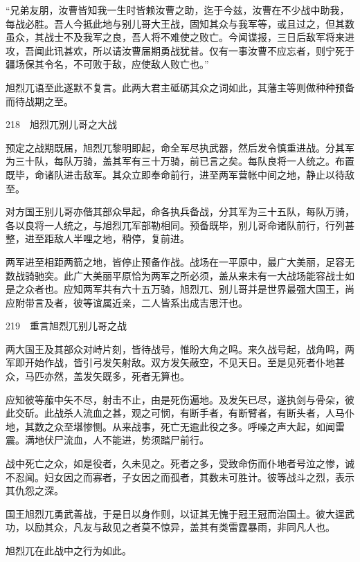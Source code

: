 \documentclass[12pt,UTF8]{ctexbook}
\begin{document}
“兄弟友朋，汝曹皆知我一生时皆赖汝曹之助，迄于今兹，汝曹在不少战中助我，每战必胜。吾人今抵此地与别儿哥大王战，固知其众与我军等，或且过之，但其数虽众，其战士不及我军之良，吾人将不难使之败亡。今闻谍报，三日后敌军将来进攻，吾闻此讯甚欢，所以请汝曹届期勇战犹昔。仅有一事汝曹不应忘者，则宁死于疆场保其令名，不可败于敌，应使敌人败亡也。”

旭烈兀语至此遂默不复言。此两大君主砥砺其众之词如此，其藩主等则做种种预备而待战期之至。





218　旭烈兀别儿哥之大战

预定之战期既届，旭烈兀黎明即起，命全军尽执武器，然后发令慎重进战。分其军为三十队，每队万骑，盖其军有三十万骑，前已言之矣。每队良将一人统之。布置既毕，命诸队进击敌军。其众立即奉命前行，进至两军营帐中间之地，静止以待敌至。

对方国王别儿哥亦偕其部众早起，命各执兵备战，分其军为三十五队，每队万骑，各以良将一人统之，与旭烈兀军部勒相同。预备既毕，别儿哥命诸队前行，行列甚整，进至距敌人半哩之地，稍停，复前进。

两军进至相距两箭之地，皆停止预备作战。战场在一平原中，最广大美丽，足容无数战骑驰突。此广大美丽平原恰为两军之所必须，盖从来未有一大战场能容战士如是之众者也。应知两军共有六十五万骑，旭烈兀、别儿哥并是世界最强大国王，尚应附带言及者，彼等谊属近亲，二人皆系出成吉思汗也。





219　重言旭烈兀别儿哥之战

两大国王及其部众对峙片刻，皆待战号，惟盼大角之鸣。来久战号起，战角鸣，两军即开始作战，皆引弓发矢射敌。双方发矢蔽空，不见天日。至是见死者仆地甚众，马匹亦然，盖发矢既多，死者无算也。

应知彼等菔中矢不尽，射击不止，由是死伤遍地。及发矢已尽，遂执剑与骨朵，彼此交斫。此战杀人流血之甚，观之可悯，有断手者，有断臂者，有断头者，人马仆地，其数之众至堪惨恻。从来战事，死亡无逾此役之多。呼噪之声大起，如闻雷震。满地伏尸流血，人不能进，势须踏尸前行。

战中死亡之众，如是役者，久未见之。死者之多，受致命伤而仆地者号泣之惨，诚不忍闻。妇女因之而寡者，子女因之而孤者，其数未可胜计。彼等战斗之烈，表示其仇怨之深。

国王旭烈兀勇武善战，于是日以身作则，以证其无愧于冠王冠而治国土。彼大逞武功，以励其众，凡友与敌见之者莫不惊异，盖其有类雷霆暴雨，非同凡人也。

旭烈兀在此战中之行为如此。
\end{document}
